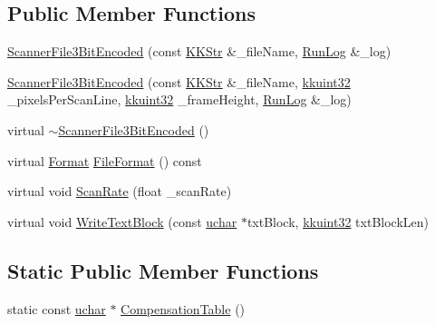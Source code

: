 \subsection*{Public Member Functions}
\begin{DoxyCompactItemize}
\item 
\hyperlink{class_k_k_l_s_c_1_1_scanner_file3_bit_encoded_ad1420de5178a63773893dd13ee3213db}{Scanner\+File3\+Bit\+Encoded} (const \hyperlink{class_k_k_b_1_1_k_k_str}{K\+K\+Str} \&\+\_\+file\+Name, \hyperlink{class_k_k_b_1_1_run_log}{Run\+Log} \&\+\_\+log)
\item 
\hyperlink{class_k_k_l_s_c_1_1_scanner_file3_bit_encoded_a5dd092b98a28a62cb5c2b4eb92ce3b87}{Scanner\+File3\+Bit\+Encoded} (const \hyperlink{class_k_k_b_1_1_k_k_str}{K\+K\+Str} \&\+\_\+file\+Name, \hyperlink{namespace_k_k_b_af8d832f05c54994a1cce25bd5743e19a}{kkuint32} \+\_\+pixels\+Per\+Scan\+Line, \hyperlink{namespace_k_k_b_af8d832f05c54994a1cce25bd5743e19a}{kkuint32} \+\_\+frame\+Height, \hyperlink{class_k_k_b_1_1_run_log}{Run\+Log} \&\+\_\+log)
\item 
virtual \hyperlink{class_k_k_l_s_c_1_1_scanner_file3_bit_encoded_a7025dd016b3307368bfe965ed2ef6d7f}{$\sim$\+Scanner\+File3\+Bit\+Encoded} ()
\item 
virtual \hyperlink{class_k_k_l_s_c_1_1_scanner_file_a9eb976c9d084a94db71a5e8d1fadb903}{Format} \hyperlink{class_k_k_l_s_c_1_1_scanner_file3_bit_encoded_a9c9fb4a4784af0a6a674ce6a7facc010}{File\+Format} () const 
\item 
virtual void \hyperlink{class_k_k_l_s_c_1_1_scanner_file3_bit_encoded_a1c42ed37eae5b7b8e664793167a975d6}{Scan\+Rate} (float \+\_\+scan\+Rate)
\item 
virtual void \hyperlink{class_k_k_l_s_c_1_1_scanner_file3_bit_encoded_ae5695bd960060cf78e74406597a536bd}{Write\+Text\+Block} (const \hyperlink{namespace_k_k_b_ace9969169bf514f9ee6185186949cdf7}{uchar} $\ast$txt\+Block, \hyperlink{namespace_k_k_b_af8d832f05c54994a1cce25bd5743e19a}{kkuint32} txt\+Block\+Len)
\end{DoxyCompactItemize}
\subsection*{Static Public Member Functions}
\begin{DoxyCompactItemize}
\item 
static const \hyperlink{namespace_k_k_b_ace9969169bf514f9ee6185186949cdf7}{uchar} $\ast$ \hyperlink{class_k_k_l_s_c_1_1_scanner_file3_bit_encoded_a912e45124ac943b21382c706bc4c3787}{Compensation\+Table} ()
\end{DoxyCompactItemize}
